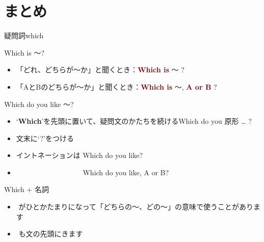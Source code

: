 \documentclass[aspectratio=169,xcolor={dvipsnames,table}]{beamer}
\begin{document}
\section{まとめ}
\begin{frame}[plain]{疑問詞which }
 
\begin{block}{Which is ～?}
\small
\begin{itemize}[square]\small
 \item 「どれ、どちらが～か」と聞くとき：\textcolor{Maroon}{\bfseries Which is}   〜 ?
 \item 「AとBのどちらが～か」と聞くとき：\textcolor{Maroon}{\bfseries Which is} 〜, \textcolor{Maroon}{\bfseries A or B} ?
\end{itemize}
     \end{block}

\begin{block}{Which do you like ～?}
\begin{itemize}[square]\small
 \item `{\bfseries Which}'を先頭に置いて、疑問文のかたちを続ける\hfill{}Which do you  原形 \ldots\,\,?
 \item   文末に`?'をつける
 \item イントネーションは Which do you like? \myDownwardPitch
 \item 　　　　　　　　　 Which do you like, A \myRisingPitch or B? \myDownwardPitch\end{itemize}
     \end{block}

\begin{block}{Which $+$ 名詞}\small
\begin{itemize}[square]\small
 \item {}\,\,がひとかたまりになって「どちらの〜、どの～」の意味で使うことがあります
 \item {}\,\,も文の先頭にきます
\end{itemize}
     \end{block}
\end{frame}
\end{document}
